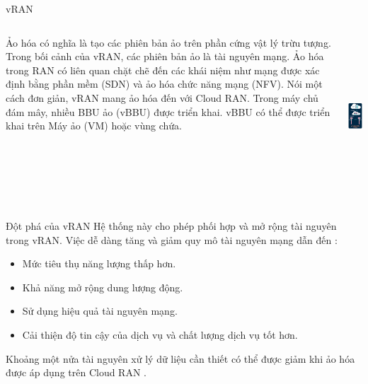 \begin{frame}{vRAN}
  \begin{columns}[T] %
    \vspace{0.4cm}
      Ảo hóa có nghĩa là tạo các phiên bản ảo trên phần cứng vật lý trừu tượng. Trong bối cảnh của vRAN, các phiên bản ảo là tài nguyên mạng. Ảo hóa trong RAN có liên quan chặt chẽ đến các khái niệm như mạng được xác định bằng phần mềm (SDN) và ảo hóa chức năng mạng (NFV). Nói một cách đơn giản, vRAN mang ảo hóa đến với Cloud RAN. Trong máy chủ đám mây, nhiều BBU ảo (vBBU) được triển khai. vBBU có thể được triển khai trên Máy ảo (VM) hoặc vùng chứa.

      \centering
      \vspace{0.5cm}
      \includegraphics[height=6cm, keepaspectratio]{picture/vRan.png}
      \\[1ex]
  \end{columns}
\end{frame}

\begin{frame}{Đột phá của vRAN}
  Hệ thống này cho phép phối hợp và mở rộng tài nguyên trong vRAN. Việc dễ dàng tăng và giảm quy mô tài nguyên mạng dẫn đến : 
  \begin{itemize}
    \item Mức tiêu thụ năng lượng thấp hơn.
    \item Khả năng mở rộng dung lượng động.
    \item Sử dụng hiệu quả tài nguyên mạng.
    \item Cải thiện độ tin cậy của dịch vụ và chất lượng dịch vụ tốt hơn.
  \end{itemize}

  \vspace{0.3cm}

  Khoảng một nửa tài nguyên xử lý dữ liệu cần thiết có thể được giảm khi ảo hóa được áp dụng trên Cloud RAN .

\end{frame}

